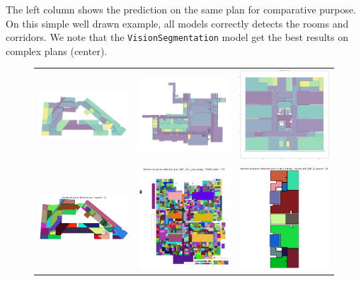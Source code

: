 \documentclass[11pt]{article}
\begin{document}
The left column shows the prediction on the same plan for comparative purpose. 
On this simple well drawn example, all models correctly detects the rooms and
corridors. 
We note that the \texttt{VisionSegmentation} model get the best results on complex plans (center).
\begin{figure}[hp]
    \centering
    \begin{tabular}{ccc}
        \includegraphics[width=0.3\linewidth]{figures/SBC_pred-4.png} &
        \includegraphics[width=0.3\linewidth]{figures/SBC_pred-3.png} &
        \includegraphics[width=0.3\linewidth]{figures/SBC_pred-1.png} \\
        \includegraphics[width=0.3\linewidth]{figures/CVSeg_pred-3.png} &
        \includegraphics[width=0.3\linewidth]{figures/CVSeg_pred-2.png} &
        \includegraphics[width=0.3\linewidth]{figures/CVSeg_pred-1.png} \\

\end{tabular}
\end{figure}
\end{document}
